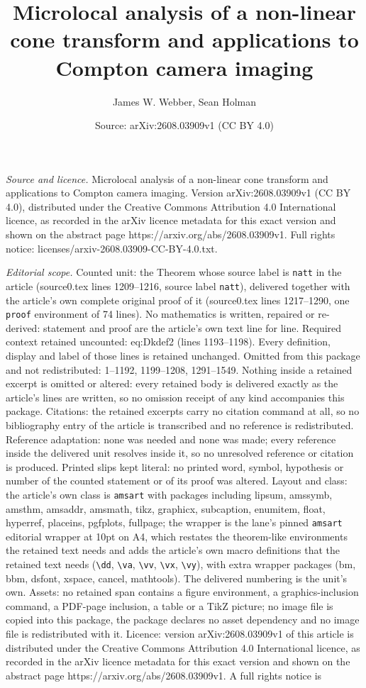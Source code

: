 \documentclass[10pt,a4paper]{amsart}
\title[Microlocal analysis of a non-linear cone transform and appli]{Microlocal analysis of a non-linear cone transform and applications to Compton camera imaging}
\author{James W. Webber, Sean Holman}
\date{Source: arXiv:2608.03909v1 (CC BY 4.0)}
\begin{document}
\maketitle

\noindent\emph{Source and licence.} Microlocal analysis of a non-linear cone transform and applications to Compton camera imaging. Version arXiv:2608.03909v1 (CC BY 4.0), distributed under the Creative Commons Attribution 4.0 International licence, as recorded in the arXiv licence metadata for this exact version and shown on the abstract page https://arxiv.org/abs/2608.03909v1. Full rights notice: licenses/arxiv-2608.03909-CC-BY-4.0.txt.\par\smallskip

\noindent\textit{Editorial scope.} Counted unit: the Theorem whose source label is \texttt{natt} in the article (source0.tex lines 1209--1216, source label \texttt{natt}), delivered together with the article's own complete original proof of it (source0.tex lines 1217--1290, one \texttt{proof} environment of 74 lines). No mathematics is written, repaired or re-derived: statement and proof are the article's own text line for line. Required context retained uncounted: eq:Dkdef2 (lines 1193--1198). Every definition, display and label of those lines is retained unchanged. Omitted from this package and not redistributed: 1--1192, 1199--1208, 1291--1549. Nothing inside a retained excerpt is omitted or altered: every retained body is delivered exactly as the article's lines are written, so no omission receipt of any kind accompanies this package. Citations: the retained excerpts carry no citation command at all, so no bibliography entry of the article is transcribed and no reference is redistributed. Reference adaptation: none was needed and none was made; every reference inside the delivered unit resolves inside it, so no unresolved reference or citation is produced. Printed slips kept literal: no printed word, symbol, hypothesis or number of the counted statement or of its proof was altered. Layout and class: the article's own class is \texttt{amsart} with packages including lipsum, amssymb, amsthm, amsaddr, amsmath, tikz, graphicx, subcaption, enumitem, float, hyperref, placeins, pgfplots, fullpage; the wrapper is the lane's pinned \texttt{amsart} editorial wrapper at 10pt on A4, which restates the theorem-like environments the retained text needs and adds the article's own macro definitions that the retained text needs (\texttt{\textbackslash dd}, \texttt{\textbackslash va}, \texttt{\textbackslash vv}, \texttt{\textbackslash vx}, \texttt{\textbackslash vy}), with extra wrapper packages (bm, bbm, dsfont, xspace, cancel, mathtools). The delivered numbering is the unit's own. Assets: no retained span contains a figure environment, a graphics-inclusion command, a PDF-page inclusion, a table or a TikZ picture; no image file is copied into this package, the package declares no asset dependency and no image file is redistributed with it. Licence: version arXiv:2608.03909v1 of this article is distributed under the Creative Commons Attribution 4.0 International licence, as recorded in the arXiv licence metadata for this exact version and shown on the abstract page https://arxiv.org/abs/2608.03909v1. A full rights notice is 
\end{document}
